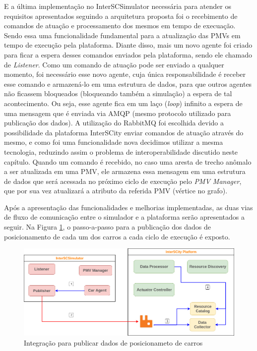 E a última implementação no InterSCSimulator necessária para atender os requisitos apresentados seguindo a arquitetura proposta foi o recebimento de comandos de atuação e
processamento dos mesmos em tempo de execuação.
Sendo essa uma funcionalidade fundamental para a atualização das PMVs em tempo de execução pela plataforma.
Diante disso, mais um novo agente foi criado para ficar a espera desses comandos enviados pela plataforma, sendo ele chamado de \textit{Listener}.
Como um comando de atuação pode ser enviado a qualquer momento, foi necessário esse novo agente, cuja única responsabilidade é receber esse comando e armazená-lo em uma
estrutura de dados, para que outros agentes não ficassem bloqueados (bloqueando também a simulação) a espera de tal acontecimento.
Ou seja, esse agente fica em um laço (\textit{loop}) infinito a espera de uma mensagem que é enviada via AMQP (mesmo protocolo utilizado para publicação dos dados).
A utilização do RabbitMQ foi escolhida devido a possibilidade da plataforma InterSCity enviar comandos de atuação através do mesmo, e como foi uma funcionalidade nova
decidimos utilizar a mesma tecnologia, reduzindo assim o problema de interoperabilidade discutido neste capítulo.
Quando um comando é recebido, no caso uma aresta de trecho anômalo a ser atualizada em uma PMV, ele armazena essa mensagem em uma estrutura de dados que será acessada no
próximo ciclo de execução pelo \textit{PMV Manager}, que por sua vez atualizará a atributo da referida PMV (vértice no grafo).

Após a apresentação das funcionalidades e melhorias implementadas, as duas vias de fluxo de comunicação entre o simulador e a plataforma serão apresentados a seguir.
Na Figura \ref{fig:smart_traffic_publish_data}, o passo-a-passo para a publicação dos dados de posicionamento de cada um dos carros a cada ciclo de execução é exposto.

\begin{figure}[ht]
	\centering
	\includegraphics[width=\textwidth]{figuras/integration-publish-car-position.png}
	\caption{Integração para publicar dados de posicionameto de carros}
	\label{fig:smart_traffic_publish_data}
\end{figure}


